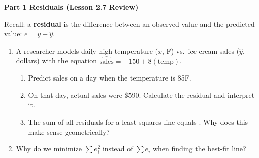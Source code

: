 \documentclass[10pt]{article}
\begin{document}
\namedateperiod

\vspace{0.3in}

{\large\bfseries\color{navy} Part 1 \quad Residuals (Lesson 2.7 Review)}

\vspace{0.12in}
\noindent Recall: a \textbf{residual} is the difference between an observed value and the
predicted value: $e = y - \hat{y}$.

\vspace{0.1in}

\begin{enumerate}[leftmargin=1.6em, itemsep=0.22in]

  \item A researcher models daily high temperature ($x$, \textdegree F) vs.\ ice cream sales
        ($\hat{y}$, dollars) with the equation $\widehat{\text{sales}} = -150 + 8(\text{temp})$.

        \begin{enumerate}[label=\textbf{(\alph*)}, leftmargin=1.6em, itemsep=8pt]
          \item Predict sales on a day when the temperature is 85\textdegree F.\\[8pt]

          \item On that day, actual sales were \$590. Calculate the residual and interpret it.\\[8pt]

          \item The sum of all residuals for a least-squares line equals .
                Why does this make sense geometrically?\\[8pt]
        \end{enumerate}

  \item Why do we minimize $\sum e_i^2$ instead of $\sum e_i$ when finding the best-fit line?\\[8pt]

\end{enumerate}
\end{document}
